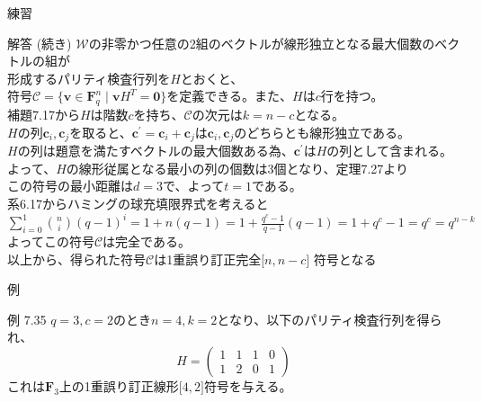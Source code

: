 \documentclass[dvipdfmx,10pt,jsarticle]{beamer}
\newcommand{\F}{\mathbf{F}}
\newcommand{\code}[1]{\mathcal{#1}}
\newcommand{\vs}[1]{\mathcal{#1}}
\newcommand{\sets}[1]{\lbrace{}  #1 \rbrace}
\newcommand{\bracket}[1]{\lbrack{} #1 \rbrack}
\newcommand{\vcode}[2]{$\bracket{#1 , #2}$}
\renewcommand{\vec}[1]{\mathbf{#1}}
\begin{document}
  \begin{frame}{練習}
    \begin{block}{解答 (続き)}
      $\vs{W}$の非零かつ任意の2組のベクトルが線形独立となる最大個数のベクトルの組が \\
      形成するパリティ検査行列を$H$とおくと、\\
      符号$\code{C} = \sets{\vec{v} \in \F_q^n \mid \vec{v} H^T = \vec{0}}$を定義できる。また、$H$は$c$行を持つ。\\
      補題7.17から$H$は階数$c$を持ち、$\code{C}$の次元は$k = n - c$となる。\\
      $H$の列$\vec{c}_i,\vec{c}_j$を取ると、$\vec{c}^\prime  = \vec{c}_i + \vec{c}_j$は$\vec{c}_i, \vec{c}_j$のどちらとも線形独立である。\\
      $H$の列は題意を満たすベクトルの最大個数ある為、$\vec{c}^\prime$は$H$の列として含まれる。 \\
      よって、$H$の線形従属となる最小の列の個数は3個となり、定理7.27より\\
      この符号の最小距離は$d=3$で、よって$t=1$である。\\
      系6.17からハミングの球充填限界式を考えると$\sum_{i=0}^{1} \binom ni {(q-1)}^i = 1 + n (q - 1) = 1 + \frac{q^c - 1}{q - 1} (q - 1) = 1 + q^c - 1 = q^c = q^{n-k}$ \\
      よってこの符号$\code{C}$は完全である。\\
      以上から、得られた符号$\code{C}$は1重誤り訂正完全\vcode{n}{n-c} 符号となる
    \end{block}
  \end{frame}
  \begin{frame}{例}
    \begin{block}{例 7.35}
      $q=3, c=2$のとき$n=4, k = 2$となり、以下のパリティ検査行列を得られ、
      \[ H = \begin{pmatrix}
          1 & 1 & 1 & 0 \\
          1 & 2 & 0 & 1
      \end{pmatrix} \]
      これは$\F_3$上の1重誤り訂正線形\vcode42符号を与える。
    \end{block}
  \end{frame}
\end{document}
